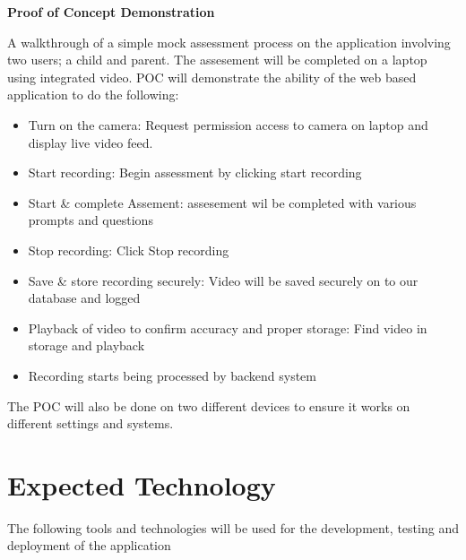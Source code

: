 \documentclass{article}
\begin{document}
\textbf{Proof of Concept Demonstration}

A walkthrough of a simple mock assessment process on the application involving two users; a child and parent. The assesement will be completed on a laptop using integrated video. POC will demonstrate the ability of the web based application to do the following: \\
\begin{itemize}
  \item Turn on the camera: Request permission access to camera on laptop and display live video feed.
  \item Start recording: Begin assessment by clicking start recording
  \item Start \& complete Assement: assesement wil be completed with various prompts and questions
  \item Stop recording: Click Stop recording
  \item Save \& store recording securely: Video will be saved securely on to our database and logged
  \item Playback of video to confirm accuracy and proper storage: Find video in storage and playback
  \item Recording starts being processed by backend system
\end{itemize}

The POC will also be done on two different devices to ensure it works on different settings and systems.

\pagebreak

\section{Expected Technology}

The following tools and technologies will be used for the development, testing and deployment of the application 
\end{document}
